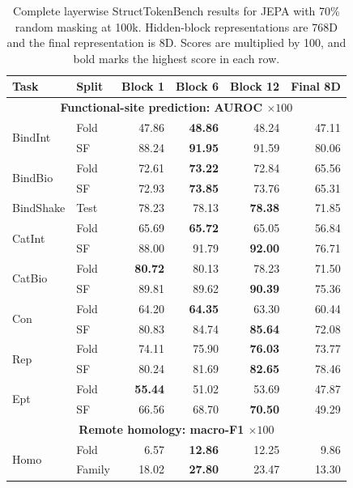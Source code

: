 \documentclass{article}
\begin{document}
\begin{table}[!htbp]
\centering
\setlength{\tabcolsep}{4pt}
\renewcommand{\arraystretch}{0.82}
\fontsize{7.4}{8.4}\selectfont
\caption{Complete layerwise StructTokenBench results for JEPA with 70\% random masking at 100k. Hidden-block representations are 768D and the final representation is 8D. Scores are multiplied by 100, and bold marks the highest score in each row.}
\label{tab:jepa-r70-layerwise}
\begin{tabular}{@{}llrrrr@{}}
\toprule
Task & Split & Block 1 & Block 6 & Block 12 & Final 8D \\
\midrule
\multicolumn{6}{c}{\textbf{Functional-site prediction: AUROC $\times100$}} \\
\midrule
\multirow{2}{*}{BindInt} & Fold & 47.86 & \textbf{48.86} & 48.24 & 47.11 \\
 & SF & 88.24 & \textbf{91.95} & 91.59 & 80.06 \\
\multirow{2}{*}{BindBio} & Fold & 72.61 & \textbf{73.22} & 72.84 & 65.56 \\
 & SF & 72.93 & \textbf{73.85} & 73.76 & 65.31 \\
BindShake & Test & 78.23 & 78.13 & \textbf{78.38} & 71.85 \\
\multirow{2}{*}{CatInt} & Fold & 65.69 & \textbf{65.72} & 65.05 & 56.84 \\
 & SF & 88.00 & 91.79 & \textbf{92.00} & 76.71 \\
\multirow{2}{*}{CatBio} & Fold & \textbf{80.72} & 80.13 & 78.23 & 71.50 \\
 & SF & 89.81 & 89.62 & \textbf{90.39} & 75.36 \\
\multirow{2}{*}{Con} & Fold & 64.20 & \textbf{64.35} & 63.30 & 60.44 \\
 & SF & 80.83 & 84.74 & \textbf{85.64} & 72.08 \\
\multirow{2}{*}{Rep} & Fold & 74.11 & 75.90 & \textbf{76.03} & 73.77 \\
 & SF & 80.24 & 81.69 & \textbf{82.65} & 78.46 \\
\multirow{2}{*}{Ept} & Fold & \textbf{55.44} & 51.02 & 53.69 & 47.87 \\
 & SF & 66.56 & 68.70 & \textbf{70.50} & 49.29 \\
\midrule
\multicolumn{6}{c}{\textbf{Remote homology: macro-F1 $\times100$}} \\
\midrule
\multirow{3}{*}{Homo} & Fold & 6.57 & \textbf{12.86} & 12.25 & 9.86 \\
 & Family & 18.02 & \textbf{27.80} & 23.47 & 13.30 \\

\end{tabular}
\end{table}
\end{document}
